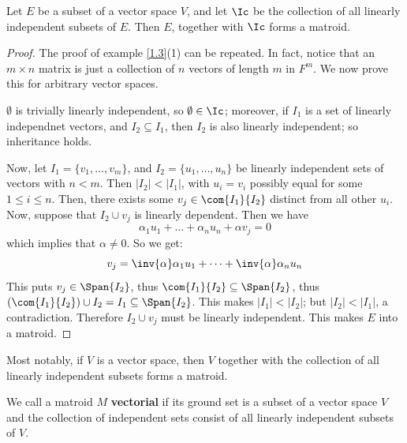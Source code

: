 \begin{lemma}\label{1.1.1}
    Let $E$ be a subset of a vector space  $V$, and let  $\Ic$ be the collection
    of all linearly independent subsets of  $E$. Then  $E$, together with  $\Ic$
    forms a matroid.
\end{lemma}
\begin{proof}
    The proof of example \ref{1.3}(1) can be repeated. In fact, notice that an $m
    \times n$ matrix is just a collection of  $n$ vectors of length  $m$ in
    $F^m$. We now prove this for arbitrary vector spaces.

    $\emptyset$ is trivially linearly independent, so  $\emptyset \in \Ic$;
    moreover, if  $I_1$ is a set of linearly independnet vectors, and $I_2
    \subseteq I_1$, then $I_2$ is also linearly independent; so inheritance
    holds.

    Now, let $I_1=\{v_1, \dots, v_m\}$, and $I_2=\{u_1, \dots, u_n\}$ be
    linearly independent sets of vectors with $n<m$. Then  $|I_2|<|I_1|$, with
    $u_i=v_i$ possibly equal for some  $1 \leq i \leq n$. Then, there exists some
    $v_j \in \com{I_1}{I_2}$ distinct from all other $u_i$. Now, suppose that
    $I_2 \cup v_j$ is linearly dependent. Then  we have
    \begin{equation*}
        \alpha_1u_1+\dots+\alpha_nu_n+\alpha v_j = 0
    \end{equation*}
    which implies that $\alpha \neq 0$. So we get:
    \begin{equation*}
        v_j=\inv{\alpha}\alpha_1u_1+\dots+\inv{\alpha}\alpha_nu_n
    \end{equation*}
    This puts $v_j \in \Span{I_2}$, thus $\com{I_1}{I_2} \subseteq \Span{I_2}$,
    thus $(\com{I_1}{I_2}) \cup I_2=I_1 \subseteq \Span{I_2}$. This makes
    $|I_1|<|I_2|$; but $|I_2|<|I_1|$, a contradiction. Therefore $I_2 \cup v_j$
    must be linearly independent. This makes $E$ into a matroid.
\end{proof}
\begin{remark}
    Most notably, if $V$ is a vector space, then  $V$ together with the
    collection of all linearly independent subsets forms a matroid.
\end{remark}

\begin{definition}
    We call a matroid $M$ \textbf{vectorial} if its ground set is a subset of a
    vector space $V$ and the collection of independent sets consist of all
    linearly independent subsets of $V$.
\end{definition}


